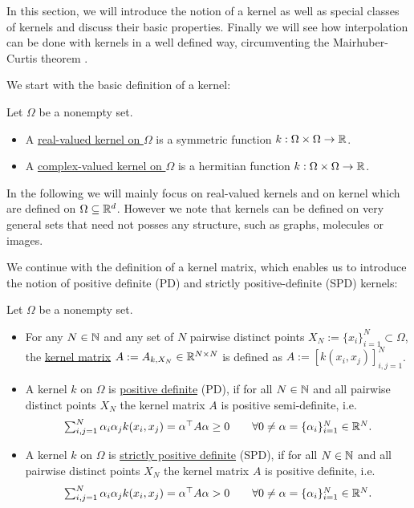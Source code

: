 In this section, we will introduce the notion of a kernel as well as special classes of kernels 
and discuss their basic properties.
Finally we will see how interpolation can be done with kernels in a well defined way, circumventing the Mairhuber-Curtis theorem .

We start with the basic definition of a kernel:

\begin{definition}
\label{def:kernel}
Let $\Omega$ be a nonempty set. 
\begin{itemize}
\item A \underline{real-valued kernel on $\Omega$} is a symmetric function $k: \Omega \times \Omega \rightarrow \mathbb{R}$.
\item A \underline{complex-valued kernel on $\Omega$} is a hermitian function $k: \Omega \times \Omega \rightarrow \mathbb{R}$.
\end{itemize}
\end{definition}

In the following we will mainly focus on real-valued kernels and on kernel which are defined on $\Omega \subseteq \mathbb{R}^d$.
However we note that kernels can be defined on very general sets that need not posses any structure, such as graphs, molecules or images.

We continue with the definition of a kernel matrix, 
which enables us to introduce the notion of positive definite (PD) and strictly positive-definite (SPD) kernels:

\begin{definition}
\label{def:positive_def_kernels}
Let $\Omega$ be a nonempty set.
\begin{itemize}
\item For any $N \in \mathbb{N}$ and any set of $N$ pairwise distinct points $X_N := \{ x_i \}_{i=1}^N \subset \Omega$, the \underline{kernel matrix} $A := A_{k, X_N} \in \mathbb{R}^{N \times N}$ is defined as $A := [k(x_i, x_j)]_{i,j=1}^N$.
\item A kernel $k$ on $\Omega$ is \underline{positive definite} (PD), if for all $N \in \mathbb{N}$ and all pairwise distinct points $X_N$ the kernel matrix $A$ is positive semi-definite, i.e.\
\begin{align*}
\textstyle \sum_{i,j=1}^N \alpha_i \alpha_j k(x_i, x_j) = \alpha^\top A \alpha \geq 0 \qquad \forall 0 \neq \alpha = \{ \alpha_i \}_{i=1}^N \in \mathbb{R}^N.
\end{align*}
\item A kernel $k$ on $\Omega$ is \underline{strictly positive definite} (SPD), if for all $N \in \mathbb{N}$ and all pairwise distinct points $X_N$ the kernel matrix $A$ is positive definite, i.e.\
\begin{align*}
\textstyle \sum_{i,j=1}^N \alpha_i \alpha_j k(x_i, x_j) = \alpha^\top A \alpha > 0 \qquad \forall 0 \neq \alpha = \{ \alpha_i \}_{i=1}^N \in \mathbb{R}^N.
\end{align*} 
\end{itemize}
\end{definition}


